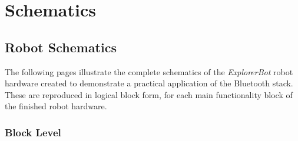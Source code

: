 \chapter{Schematics}
\label{Appendix A}

\section{Robot Schematics}

The following pages illustrate the complete schematics of the \emph{ExplorerBot} robot
hardware created to demonstrate a practical application of the Bluetooth stack. These
are reproduced in logical block form, for each main functionality block of the finished
robot hardware.

\subsection{Block Level}


